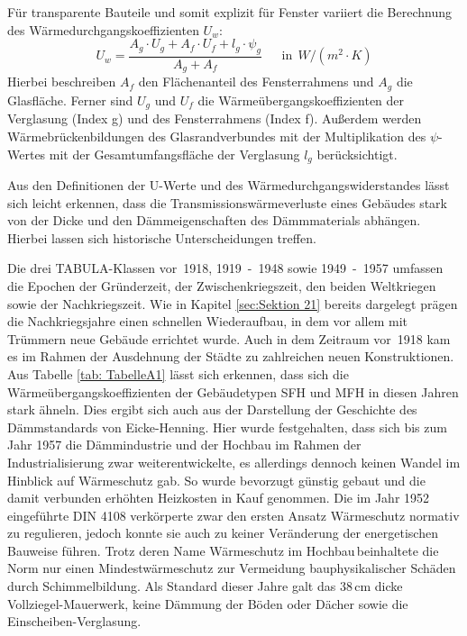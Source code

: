 Für transparente Bauteile und somit explizit für Fenster variiert die Berechnung des Wärmedurchgangskoeffizienten \(U_w\):
\begin{equation}
\label{eq:Gleichung223}
U_w = \frac{A_g \cdot U_g + A_f \cdot U_f + l_g \cdot \psi_g}{A_g + A_f}  \ \ \ \ \ \ \ \text{in} \ \ W/(m^2 \cdot K)
\end{equation}
Hierbei beschreiben \(A_f\) den Flächenanteil des Fensterrahmens und \(A_g\) die Glasfläche. Ferner sind \(U_g\) und \(U_f\) die Wärmeübergangskoeffizienten der Verglasung (Index g) und des Fensterrahmens (Index f). 
Außerdem werden Wärmebrückenbildungen des Glasrandverbundes mit der Multiplikation des \(\psi\)-Wertes mit der Gesamtumfangsfläche der Verglasung \(l_g\) berücksichtigt. \cite{Laasch.2013}

Aus den Definitionen der U-Werte und des Wärmedurchgangswiderstandes lässt sich leicht erkennen, dass die Transmissionswärmeverluste eines Gebäudes stark von der Dicke und den Dämmeigenschaften des Dämmmaterials abhängen. 
Hierbei lassen sich historische Unterscheidungen treffen.

Die drei TABULA-Klassen \mbox{vor 1918}, \mbox{1919 - 1948} sowie \mbox{1949 - 1957} umfassen die Epochen der Gründerzeit, der Zwischenkriegszeit, den beiden Weltkriegen sowie der Nachkriegszeit. 
Wie in Kapitel \ref{sec:Sektion 21} bereits dargelegt prägen die Nachkriegsjahre einen schnellen Wiederaufbau, in dem vor allem mit Trümmern neue Gebäude errichtet wurde. 
Auch in dem Zeitraum \mbox{vor 1918} kam es im Rahmen der Ausdehnung der Städte zu zahlreichen neuen Konstruktionen. 
Aus Tabelle \ref{tab: TabelleA1} lässt sich erkennen, dass sich die Wärmeübergangskoeffizienten der Gebäudetypen SFH und MFH in diesen Jahren stark ähneln. 
Dies ergibt sich auch aus der Darstellung der Geschichte des Dämmstandards von Eicke-Henning. %
Hier wurde festgehalten, dass sich bis zum Jahr 1957 die Dämmindustrie und der Hochbau im Rahmen der Industrialisierung zwar weiterentwickelte, es allerdings dennoch keinen Wandel im Hinblick auf Wärmeschutz gab.
So wurde bevorzugt günstig gebaut und die damit verbunden erhöhten Heizkosten in Kauf genommen.
Die im Jahr 1952 eingeführte DIN 4108 verkörperte zwar den ersten Ansatz Wärmeschutz normativ zu regulieren, jedoch konnte sie auch zu keiner Veränderung der energetischen Bauweise führen. 
Trotz deren Name \glqq Wärmeschutz im Hochbau\grqq\,beinhaltete die Norm nur einen Mindestwärmeschutz zur Vermeidung bauphysikalischer Schäden durch Schimmelbildung.
Als Standard dieser Jahre galt das 38\,cm dicke Vollziegel-Mauerwerk, keine Dämmung der Böden oder Dächer sowie die Einscheiben-Verglasung. \cite{EickeHenning.2011}

